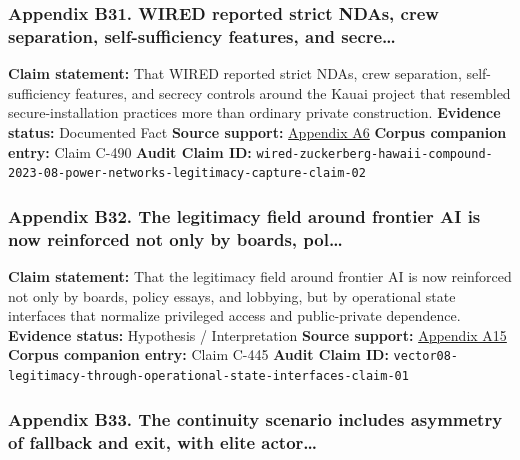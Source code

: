 \documentclass[
  american,
  11pt,
  letterpaper,
]{article}
\begin{document}
\subsubsection{Appendix B31. WIRED reported strict NDAs, crew
separation, self-sufficiency features, and
secre\ldots{}}\label{ch-09-appendix-b31-wired-reported-strict-ndas-crew-separation-self-sufficiency-features-and-secre}

\textbf{Claim statement:} That WIRED reported strict NDAs, crew
separation, self-sufficiency features, and secrecy controls around the
Kauai project that resembled secure-installation practices more than
ordinary private construction. \textbf{Evidence status:} Documented Fact
\textbf{Source support:}
\hyperref[ch-09-appendix-a6-inside-mark-zuckerbergs-top-secret-hawaii-compound]{Appendix
A6} \textbf{Corpus companion entry:} Claim C-490 \textbf{Audit Claim
ID:}
\texttt{wired-zuckerberg-hawaii-compound-2023-08-power-networks-legitimacy-capture-claim-02}

\subsubsection{Appendix B32. The legitimacy field around frontier AI is
now reinforced not only by boards,
pol\ldots{}}\label{ch-09-appendix-b32-the-legitimacy-field-around-frontier-ai-is-now-reinforced-not-only-by-boards-pol}

\textbf{Claim statement:} That the legitimacy field around frontier AI
is now reinforced not only by boards, policy essays, and lobbying, but
by operational state interfaces that normalize privileged access and
public-private dependence. \textbf{Evidence status:} Hypothesis /
Interpretation \textbf{Source support:}
\hyperref[ch-09-appendix-a15-openais-proposals-for-the-us-ai-action-plan]{Appendix
A15} \textbf{Corpus companion entry:} Claim C-445 \textbf{Audit Claim
ID:}
\texttt{vector08-legitimacy-through-operational-state-interfaces-claim-01}

\subsubsection{Appendix B33. The continuity scenario includes asymmetry
of fallback and exit, with elite
actor\ldots{}}\label{ch-09-appendix-b33-the-continuity-scenario-includes-asymmetry-of-fallback-and-exit-with-elite-actor}
\end{document}
